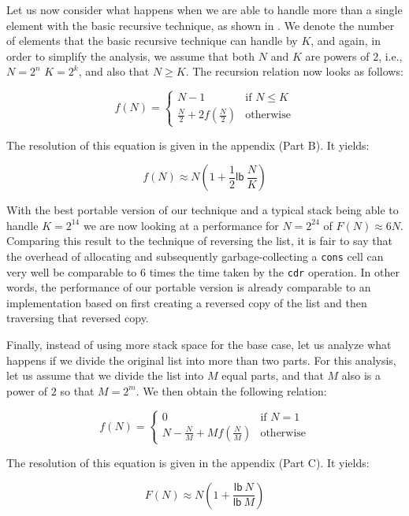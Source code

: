 Let us now consider what happens when we are able to handle more than
a single element with the basic recursive technique, as shown in
.  We denote the number of elements that the
basic recursive technique can handle by $K$, and again, in order to
simplify the analysis, we assume that both $N$ and $K$ are powers of
$2$, i.e., $N = 2^n$ $K = 2^k$, and also that $N \ge K$.  The
recursion relation now looks as follows:

\label{analyse2}
\[ f(N) = \left\{ \begin{array}{ll}
                    N-1 & \mbox{if $N \le K$} \\
                    \frac{N}{2} + 2f(\frac{N}{2}) &\mbox{otherwise}
                  \end{array} \right. \]

The resolution of this equation is given in the appendix (Part B).
It yields:

\[ f(N) \approx N(1 + \frac{1}{2}\mathsf{lb}~\frac{N}{K})\]

With the best portable version of our technique and a typical stack
being able to handle $K = 2^{14}$ we are now looking at a 
performance for $N = 2^{24}$ of $F(N) \approx 6N$.  Comparing this
result to the technique of reversing the list, it is fair to say that
the overhead of allocating and subsequently garbage-collecting a
\texttt{cons} cell can very well be comparable to $6$ times the time
taken by the \texttt{cdr} operation.  In other words, the performance
of our portable version is already comparable to an implementation
based on first creating a reversed copy of the list and then
traversing that reversed copy.

Finally, instead of using more stack space for the base case, let us
analyze what happens if we divide the original list into more than two
parts.  For this analysis, let us assume that we divide the list into
$M$ equal parts, and that $M$ also is a power of $2$ so that $M =
2^m$.  We then obtain the following relation:

\label{analyse3}
\[ f(N) = \left\{ \begin{array}{ll}
                    0 & \mbox{if $N = 1$} \\
                    N - \frac{N}{M} + Mf(\frac{N}{M}) &\mbox{otherwise}
                  \end{array} \right. \]

The resolution of this equation is given in the appendix (Part C).
It yields:

\[ F(N) \approx N(1 + \frac{\mathsf{lb}~N}{\mathsf{lb}~M}) \]

